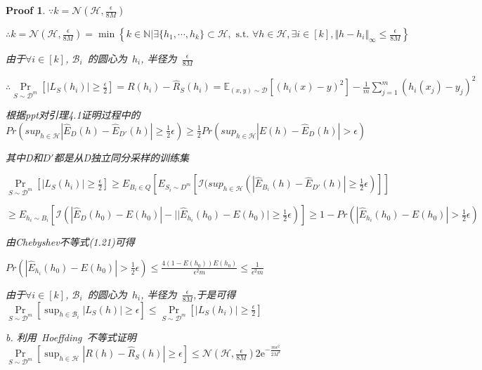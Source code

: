 \documentclass[a4paper,UTF8]{article}
\numberwithin{equation}{section}
\newtheorem*{myProof}{Proof}
\begin{document}
\begin{myProof}
		$\because k = \mathcal{N} \left( \mathcal{H} , \frac{\epsilon}{8M} \right)$
		
		$\therefore k = \mathcal{N} ( \mathcal{H} , \frac{\epsilon }{8M} ) 
		= \min \left\{ k \in \mathbb{N} | \exists \{ h_1 , \cdots , h_k \} \subset \mathcal{H} , \text{ s.t. } \forall h \in \mathcal{H} , \exists i \in [k] , \Vert h - h_i \Vert_\infty \leqslant \frac{\epsilon }{8M}  \right\}$
		
		由于$\forall i \in [k]$, $\mathcal{B}_i$~的圆心为~$h_i$, 半径为~$\frac{\epsilon}{8M}$
		
		$\therefore \mathop{\text{Pr}} \limits_{S \sim \mathcal{D}^m} \left[ \left| L_S(h_i) \right| \geqslant \frac{\epsilon}{2} \right] = R(h_i) -  \hat{R}_S(h_i) = \mathbb{E}_{(x,y) \sim \mathcal{D}} \left[ (h_i(x)-y)^2 \right] - \frac{1}{m} \sum_{j=1}^m (h_i(x_j)-y_j)^2$
		
		根据ppt对引理4.1证明过程中的$Pr(sup_{h \in \mathcal{H}} |\hat{E}_D(h) - \hat{E}_{D'}(h) | \geq \frac{1}{2}\epsilon  ) \geq \frac{1}{2}Pr(sup_{h \in \mathcal{H}}|E(h) - \hat{E}_D(h)| > \epsilon )$
		
		其中D和$D'$都是从D独立同分采样的训练集
		
		$\mathop{\text{Pr}} \limits_{S \sim \mathcal{D}^m} \left[ \left| L_S(h_i) \right| \geqslant \frac{\epsilon}{2} \right] \geq E_{B_i \in Q}[E_{S_i\sim D^m}[\mathcal{I}(sup_{h \in \mathcal{H}}(|\hat{E}_{B_i}(h) - \hat{E}_{D'}(h)| \geq \frac{1}{2}\epsilon  )]]$
		
		$\geq E_{h_i\sim B_i} [\mathcal{I}(|\hat{E}_D(h_0)-E(h_0)|-||\hat{E}_{h_i}(h_0)-E(h_0)| \geq \frac{1}{2}\epsilon  )] \geq 1-Pr(|\hat{E}_{h_i}(h_0)-E(h_0)| > \frac{1}{2}\epsilon  )$
		
		由Chebyshev不等式(1.21)可得
		
		$Pr(|\hat{E}_{h_i}(h_0)-E(h_0)| > \frac{1}{2}\epsilon  ) \leq \frac{4(1-E(h_0))E(h_0)}{\epsilon ^2m} \leq \frac{1}{\epsilon ^2m}  $
		
		由于$\forall i \in [k]$, $\mathcal{B}_i$~的圆心为~$h_i$, 半径为~$\frac{\epsilon}{8M}$,于是可得
		$\mathop{\text{Pr}} \limits_{S \sim \mathcal{D}^m} \left[ \sup_{h \in \mathcal{B}_i} \left| L_S(h) \right| \geqslant \epsilon \right] 
		\leqslant \mathop{\text{Pr}} \limits_{S \sim \mathcal{D}^m} \left[ \left| L_S(h_i) \right| \geqslant \frac{\epsilon}{2} \right]$
		
		
		b. 利用~Hoeffding~不等式证明
		$\mathop{\text{Pr}} \limits_{S \sim \mathcal{D}^m} \left[ \sup_{h \in \mathcal{H}} \left| R(h) - \hat{R}_S(h) \right| \geqslant \epsilon \right] 
		\leqslant \mathcal{N} \left( \mathcal{H} , \frac{\epsilon}{8M} \right) 2 \mathrm{e}^{ - \frac{m\epsilon^2}{2M^4} }$
		

\end{myProof}
\end{document}
